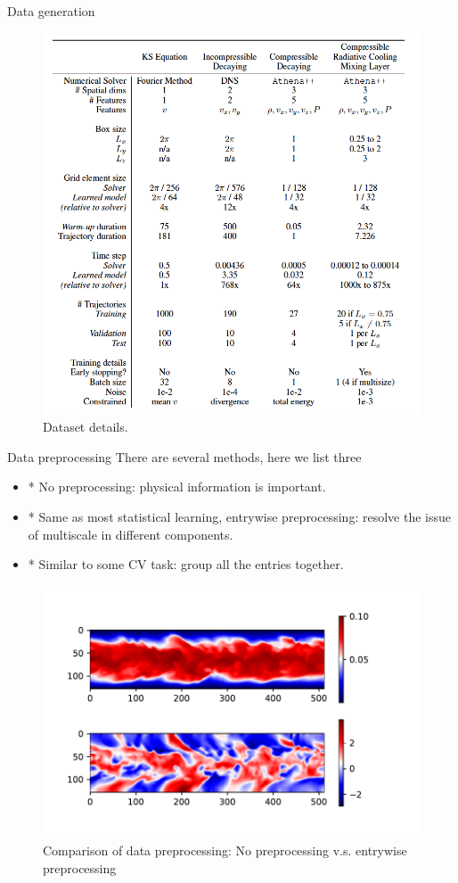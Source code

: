 \documentclass{beamer}
\begin{document}
\begin{frame}{Data generation}
	\begin{figure}[ht]
		\centering
		\centerline{\includegraphics[width=.6\linewidth]{fig/dataset.png}}
		\caption{Dataset details.}
	\end{figure}
\end{frame}

\begin{frame}{Data preprocessing}
	There are several methods, here we list three
	\begin{itemize}
		\item * No preprocessing: physical information is important.
		\item * Same as most statistical learning, entrywise preprocessing: 
		resolve the issue of multiscale in different components.
		\item * Similar to some CV task: group all the entries together. 
	\end{itemize}
	\begin{figure}[ht]
		\centering
		\centerline{\includegraphics[width=.6\linewidth]{fig/data-std.pdf}}
		\caption{Comparison of data preprocessing: No preprocessing v.s. entrywise preprocessing}
	\end{figure}
\end{frame}
\end{document}
